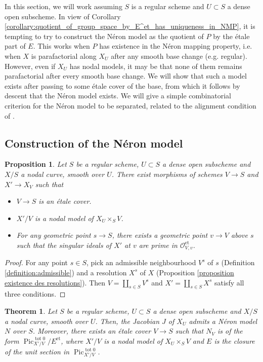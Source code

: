\documentclass[a4paper,12pt]{amsart} %
\numberwithin{equation}{subsection}
\newcommand{\on}[1]{\operatorname{#1}}
\theoremstyle{definition}
\theoremstyle{plain}%
\newtheorem{proposition}[definition]{Proposition}
\newtheorem{theorem}[definition]{Theorem}
\theoremstyle{remark}
\begin{document}
In this section, we will work assuming $S$ is a regular scheme and $U\subset S$ a dense open subscheme. In view of Corollary \ref{corollary:quotient_of_group_space_by_E^et_has_uniqueness_in_NMP}, it is tempting to try to construct the Néron model as the quotient of $P$ by the étale part of $E$. This works when $P$ has existence in the Néron mapping property, i.e. when $X$ is parafactorial along $X_U$ after any smooth base change (e.g. regular). However, even if $X_U$ has nodal models, it may be that none of them remains parafactorial after every smooth base change. We will show that such a model exists after passing to some étale cover of the base, from which it follows by descent that the Néron model exists. We will give a simple combinatorial criterion for the Néron model to be separated, related to the alignment condition of \cite{Holmes}.


\subsection{Construction of the Néron model}



\begin{proposition}\label{proposition:nodal_curves_have_quasi_resolutions}
Let $S$ be a regular scheme, $U\subset S$ a dense open subscheme and $X/S$ a nodal curve, smooth over $U$. There exist morphisms of schemes $V \to S$ and $X'\to X_V$ such that
\begin{itemize}
\item $V \to S$ is an étale cover.
\item $X'/V$ is a nodal model of $X_U\times_S V$.
\item For any geometric point $s \to S$, there exists a geometric point $v \to V$ above $s$ such that the singular ideals of $X'$ at $v$ are prime in $\mathcal{O}_{V,v}^{\on{et}}$.
\end{itemize}
\end{proposition}

\begin{proof}
For any point $s\in S$, pick an admissible neighbourhood $V^s$ of $s$ (Definition \ref{definition:admissible}) and a resolution $X^s$ of $X$ (Proposition \ref{proposition existence des resolutions}). Then $V=\coprod\limits_{s\in S} V^s$ and $X'=\coprod\limits_{s\in S} X^s$ satisfy all three conditions.
\end{proof}

\begin{theorem}\label{theorem:NMs_of_jacobians}
Let $S$ be a regular scheme, $U\subset S$ a dense open subscheme and $X/S$ a nodal curve, smooth over $U$. Then, the Jacobian $J$ of $X_U$ admits a Néron model $N$ over $S$. Moreover, there exists an étale cover $V \to S$ such that $N_V$ is of the form $\operatorname{Pic}^{\on{tot}0}_{X'/V}/E^{\on{et}}$, where $X'/V$ is a nodal model of $X_U\times_S V$ and $E$ is the closure of the unit section in $\operatorname{Pic}^{\on{tot}0}_{X'/V}$.
\end{theorem}
\end{document}
